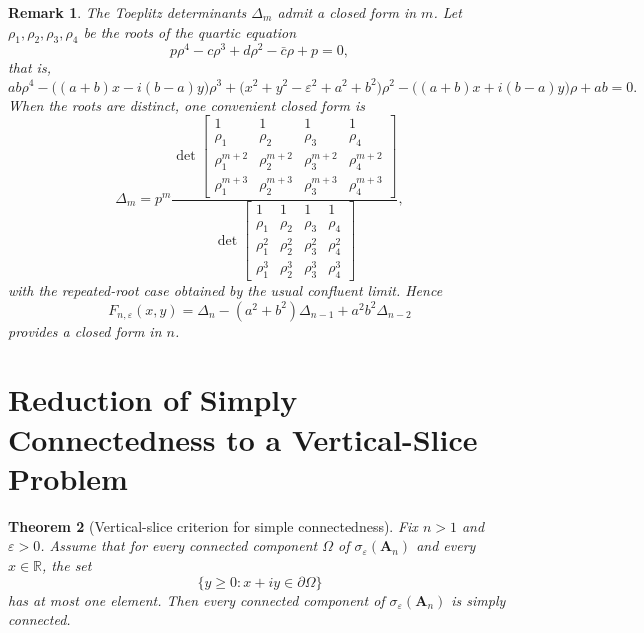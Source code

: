 \documentclass[11pt]{article}
\newtheorem{theorem}{Theorem}[section]
\newtheorem{remark}[theorem]{Remark}
\begin{document}
\begin{remark}\label{rem:quartic-closed-form}
The Toeplitz determinants \(\Delta_m\) admit a closed form in \(m\). Let
\(\rho_1,\rho_2,\rho_3,\rho_4\) be the roots of the quartic equation
\[
p\rho^4-c\rho^3+d\rho^2-\bar c\rho+p=0,
\]
that is,
\[
ab\rho^4-\bigl((a+b)x-i(b-a)y\bigr)\rho^3
+\bigl(x^2+y^2-\varepsilon^2+a^2+b^2\bigr)\rho^2
-\bigl((a+b)x+i(b-a)y\bigr)\rho
+ab=0.
\]
When the roots are distinct, one convenient closed form is
\[
\Delta_m
=p^m
\frac{
\det
\begin{bmatrix}
1&1&1&1\\
\rho_1&\rho_2&\rho_3&\rho_4\\
\rho_1^{m+2}&\rho_2^{m+2}&\rho_3^{m+2}&\rho_4^{m+2}\\
\rho_1^{m+3}&\rho_2^{m+3}&\rho_3^{m+3}&\rho_4^{m+3}
\end{bmatrix}
}{
\det
\begin{bmatrix}
1&1&1&1\\
\rho_1&\rho_2&\rho_3&\rho_4\\
\rho_1^2&\rho_2^2&\rho_3^2&\rho_4^2\\
\rho_1^3&\rho_2^3&\rho_3^3&\rho_4^3
\end{bmatrix}
},
\]
with the repeated-root case obtained by the usual confluent limit. Hence
\[
F_{n,\varepsilon}(x,y)
=\Delta_n-(a^2+b^2)\Delta_{n-1}+a^2b^2\Delta_{n-2}
\]
provides a closed form in \(n\).
\end{remark}

\section{Reduction of Simply Connectedness to a Vertical-Slice Problem}

\begin{theorem}[Vertical-slice criterion for simple connectedness]\label{thm:vertical-slice-criterion}
Fix \(n>1\) and \(\varepsilon>0\). Assume that for every connected component \(\Omega\) of
\(\sigma_\varepsilon(\mathbf{A}_n)\) and every \(x\in\mathbb{R}\), the set
\[
\{y\ge 0:x+iy\in \partial\Omega\}
\]
has at most one element. Then every connected component of \(\sigma_\varepsilon(\mathbf{A}_n)\) is simply connected.
\end{theorem}
\end{document}
